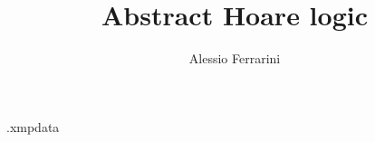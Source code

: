 
\newcommand{\myName}{Alessio Ferrarini}
\newcommand{\myTitle}{Abstract Hoare logic}
\newcommand{\myDegree}{Master degree thesis}
\newcommand{\myUni}{University of Padova}
\newcommand{\myFaculty}{Master degree in Computer Science}
\newcommand{\myDepartment}{Department of Mathematics ``Tullio Levi-Civita''}
\newcommand{\profTitle}{Prof.}
\newcommand{\myProf}{Francesco Ranzato}
\newcommand{\myCoProf}{Paolo Baldan}
\newcommand{\myLocation}{Padova}
\newcommand{\myAA}{2023--2024}
\newcommand{\myTime}{April}

\title{\myTitle}
\author{\myName}

\begin{filecontents*}{\jobname.xmpdata}
\end{filecontents*}



